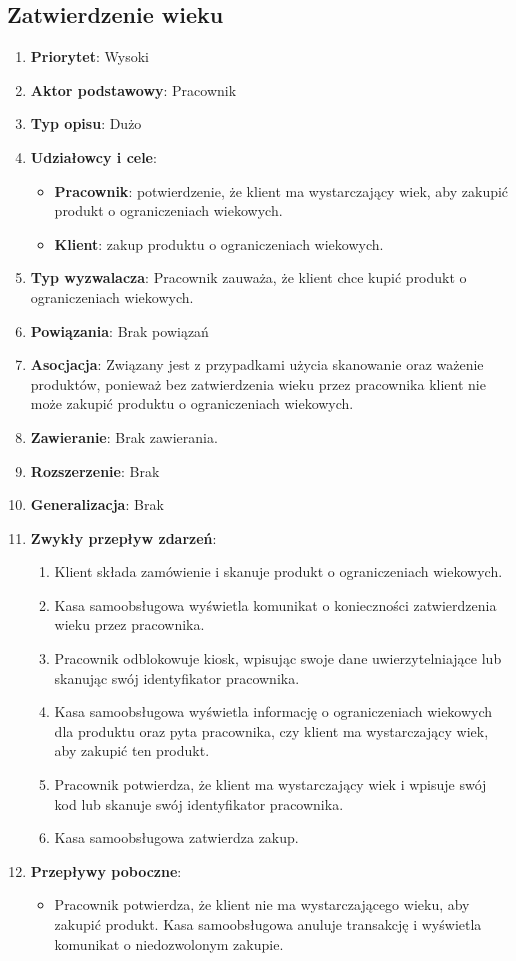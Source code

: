 \documentclass{article}
\begin{document}
\subsection{Zatwierdzenie wieku}
\begin{enumerate}
\item \textbf{Priorytet}: Wysoki
\item \textbf{Aktor podstawowy}: Pracownik
\item \textbf{Typ opisu}: Dużo
\item \textbf{Udziałowcy i cele}:
\begin{itemize}
\item \textbf{Pracownik}: potwierdzenie, że klient ma wystarczający wiek, aby zakupić produkt o ograniczeniach wiekowych.
\item \textbf{Klient}: zakup produktu o ograniczeniach wiekowych.
\end{itemize}
\item \textbf{Typ wyzwalacza}: Pracownik zauważa, że klient chce kupić produkt o ograniczeniach wiekowych.
\item \textbf{Powiązania}: Brak powiązań
\item \textbf{Asocjacja}: Związany jest z przypadkami użycia skanowanie oraz ważenie produktów, ponieważ bez zatwierdzenia wieku przez pracownika klient nie może zakupić produktu o ograniczeniach wiekowych.
\item \textbf{Zawieranie}: Brak zawierania.
\item \textbf{Rozszerzenie}: Brak
\item \textbf{Generalizacja}: Brak
\item \textbf{Zwykły przepływ zdarzeń}:
\begin{enumerate}
\item Klient składa zamówienie i skanuje produkt o ograniczeniach wiekowych.
\item Kasa samoobsługowa wyświetla komunikat o konieczności zatwierdzenia wieku przez pracownika.
\item Pracownik odblokowuje kiosk, wpisując swoje dane uwierzytelniające lub skanując swój identyfikator pracownika.
\item Kasa samoobsługowa wyświetla informację o ograniczeniach wiekowych dla produktu oraz pyta pracownika, czy klient ma wystarczający wiek, aby zakupić ten produkt.
\item Pracownik potwierdza, że klient ma wystarczający wiek i wpisuje swój kod lub skanuje swój identyfikator pracownika.
\item Kasa samoobsługowa zatwierdza zakup.
\end{enumerate}
\item \textbf{Przepływy poboczne}:
\begin{itemize}
\item Pracownik potwierdza, że klient nie ma wystarczającego wieku, aby zakupić produkt. Kasa samoobsługowa anuluje transakcję i wyświetla komunikat o niedozwolonym zakupie.
\end{itemize}
\end{enumerate}
\end{document}

